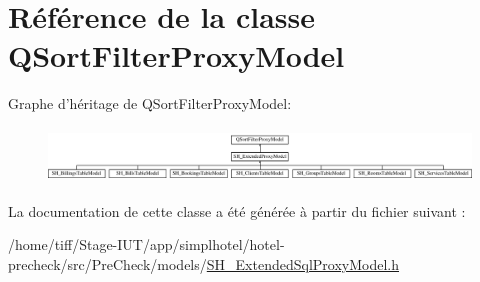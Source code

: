 \hypertarget{classQSortFilterProxyModel}{\section{Référence de la classe Q\-Sort\-Filter\-Proxy\-Model}
\label{classQSortFilterProxyModel}
}
Graphe d'héritage de Q\-Sort\-Filter\-Proxy\-Model\-:\begin{figure}[H]
\begin{center}
\leavevmode
\includegraphics[height=1.463415cm]{classQSortFilterProxyModel}
\end{center}
\end{figure}


La documentation de cette classe a été générée à partir du fichier suivant \-:\begin{DoxyCompactItemize}
\item 
/home/tiff/\-Stage-\/\-I\-U\-T/app/simplhotel/hotel-\/precheck/src/\-Pre\-Check/models/\hyperlink{SH__ExtendedSqlProxyModel_8h}{S\-H\-\_\-\-Extended\-Sql\-Proxy\-Model.\-h}\end{DoxyCompactItemize}
